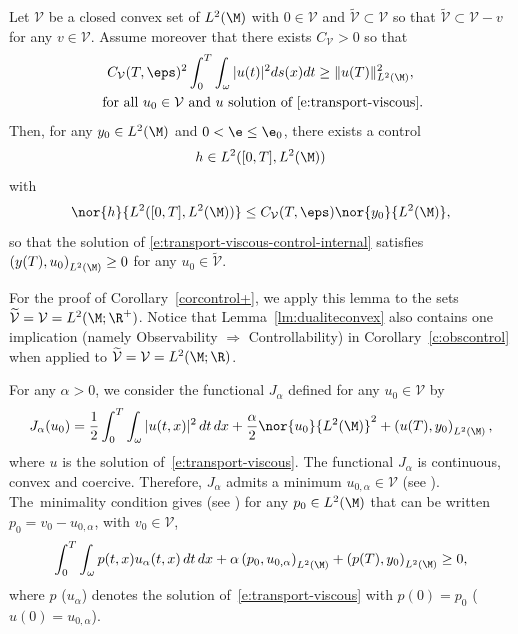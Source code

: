 \begin{lemma}
\label{lm:dualiteconvex}
Let $\mathcal{V}$ be a closed convex set of $L^2(\M)$ with $0\in \mathcal{V}$ and $\widetilde{\mathcal{V}}\subset \mathcal{V}$ so that $\widetilde{\mathcal{V}}\subset\mathcal{V}-v $ for any $v\in \mathcal{V}$. Assume moreover that there exists $C_{\mathcal{V}}>0$ so that
\begin{multline}
\label{e:observV}
C_{\mathcal{V}}(T,\eps)^2 \int_0^T\int_\omega |u(t)|^2 ds(x)dt \geq \|u (T)\|_{L^2(\M)}^2, \\ \text{ for all } u_0 \in \mathcal{V}\text{ and } u \text{ solution of~\eqref{e:transport-viscous}}.
\end{multline}
Then, for any $y_{0}\in L^{2}(\M)$ and $0<\e\leq \e_{0}$, there exists a control
\[
h\in L^2([0,T],L^2(\M))
\]
with
\[
\nor{h}{L^2([0,T],L^2(\M))}\leq C_{\mathcal{V}}(T,\eps)\nor{y_{0}}{L^{2}(\M)},
\]
so that the solution of \eqref{e:transport-viscous-control-internal} satisfies $\left( y(T),u_0\right)_{L^2(\M)}\geq 0$ for any $u_0\in \widetilde{\mathcal{V}}$.
\end{lemma}
For the proof of Corollary~\ref{corcontrol+}, we apply this lemma to the sets $\widetilde{\mathcal{V}}= \mathcal{V}=L^2(\M; \R^+)$. Notice that Lemma~\ref{lm:dualiteconvex} also contains one implication (namely Observability $\Rightarrow$ Controllability) in Corollary~\ref{c:obscontrol} when applied to $\widetilde{\mathcal{V}}= \mathcal{V}=L^2(\M; \R)$.

\bnp
For any $\alpha>0$, we consider the functional $J_{\alpha}$ defined for any $u_0\in \mathcal{V}$ by
\[
J_{\alpha}(u_0)=\frac12 \int_0^T\int_\omega |u(t,x)|^2 \,dt\,dx + \frac{\alpha}{2} \nor{u_0}{L^2(\M)}^2+\left( u (T),y_0\right)_{L^2(\M)},
\]
where $u$ is the solution of~\eqref{e:transport-viscous}. The functional $J_{\alpha}$ is continuous, convex and coercive. Therefore, $J_{\alpha}$ admits a minimum $u_{0,\alpha}\in \mathcal{V}$ (see \eg \cite[Chap.\,II, Prop.\,1.2]{ET:74}). The~minimality condition gives (see \eg \cite[Chap.\,II, Proposition 2.1]{ET:74}) for any $p_0\in L^{2}(\M)$ that can be written $p_0=v_0-u_{0,\alpha}$, with $v_0\in \mathcal{V}$,
\begin{equation}
\label{e:Lagrange}
\int_0^T\int_\omega p(t,x) u_{\alpha}(t,x)\,dt\,dx+ \alpha\left( p_0,u_{0,\alpha}\right)_{L^2(\M)}+ \left( p (T),y_0\right)_{L^2(\M)} \geq 0,
\end{equation}
where $p$ (\resp $u_\alpha$) denotes the solution of~\eqref{e:transport-viscous} with $p(0)=p_0$ (\resp \hbox{$u(0)=u_{0,\alpha}$}).

